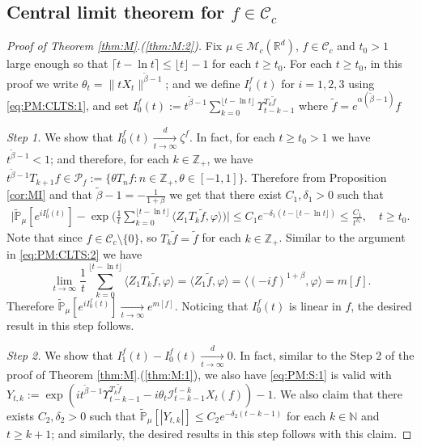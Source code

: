 \documentclass[12pt,a4paper]{amsart}
\theoremstyle{plain}
\theoremstyle{definition}
\numberwithin{equation}{section}
\begin{document}
\subsection{Central limit theorem for $f \in \mathcal C_c$}
\begin{proof}[Proof of Theorem \ref{thm:M}.(\ref{thm:M:2})]
  	Fix $\mu\in \mathcal M_c(\mathbb R^d)$, $f\in \mathcal C_c$ and $t_0 > 1$ large enough so that $ \lceil t - \ln t\rceil \leq \lfloor t \rfloor - 1$ for each $t\geq t_0$.
    For each $t\geq t_0$, in this proof we write $\theta_t = \|t X_t\|^{\tilde \beta - 1}$; and we define $I_i^f(t)$ for $i = 1,2,3$ using \eqref{eq:PM:CLTS:1}, and set
$
    I^f_0(t)
    := t^{\tilde \beta - 1}\sum_{k=0}^{\lfloor t-\ln t \rfloor} \Upsilon_{t-k-1}^{T_{k} \tilde f}
$
where $\tilde f = e^{\alpha(\tilde \beta - 1)} f$
  
  \emph{Step 1.} We show that $I^f_0(t) \xrightarrow[t\to \infty]{d} \zeta^f$. 
  In fact, for each $t \geq  t_0 > 1$ we have $t^{\tilde \beta - 1} < 1$; and therefore, for each $k \in \mathbb Z_+$, we have $t^{\tilde \beta - 1} T_{k+1} f \in \mathcal P_f:=\{\theta T_n f: n \in \mathbb Z_+, \theta \in [-1,1]\}$. 
  Therefore from Proposition \ref{cor:MI} and that $\tilde \beta - 1 = -\frac{1}{1+\beta}$ we get that there exist $C_1,\delta_1 > 0$ such that
  \begin{align}
    \Big|\mathbb{\widetilde{P}}_{\mu} [e^{i I^f_0(t)} ]-\exp\Big(\frac{1}{t}\sum_{k=0}^{\lfloor t-\ln t \rfloor} \langle Z_1T_{k}\tilde f, \varphi\rangle \Big)\Big|
    \leq C_1 e^{-\delta_1(t - \lfloor t - \ln t\rfloor)}
    \leq \frac{C_1}{t^{\delta_1}},
    \quad t\geq t_0.
  \end{align}
  Note that since $f \in \mathcal C_c\setminus \{0\}$, so $T_k \tilde f = \tilde f$ for each $k \in \mathbb Z_+$.
  Similar to the argument in \eqref{eq:PM:CLTS:2} we have 
  \[ 
    \lim_{t\to \infty} \frac{1}{t}\sum_{k=0}^{\lfloor t-\ln t \rfloor} \langle Z_1 T_{k}\tilde f, \varphi\rangle
    = \langle Z_1 \tilde f,\varphi \rangle
    = \langle (-if)^{1+\beta}, \varphi \rangle
    = m[f].
  \]
  Therefore $\mathbb {\widetilde P}_\mu[e^{i I^f_0(t)}] \xrightarrow[t\to \infty]{} e^{m[f]}$.
  Noticing that $I_0^f(t)$ is linear in $f$, the desired result in this step follows. 

  \emph{Step 2.} We show that $ I^f_1(t) - I^f_0 (t) \xrightarrow[t\to \infty]{d} 0$.
  In fact, similar to the Step 2 of the proof of Theorem \ref{thm:M}.(\ref{thm:M:1}), we also have \eqref{eq:PM:S:1} is valid with
\(
    Y_{t,k}
    := \exp(i t^{\tilde \beta - 1} \Upsilon_{t-k-1}^{T_{k}\tilde f} - i\theta_t \mathcal I_{t-k-1}^{t-k} X_t(f)) - 1.
\)
  We also claim that there exists $C_2, \delta_2>0$ such that \(\widetilde {\mathbb P}_\mu [|Y_{t,k}|] \leq C_2 e^{-\delta_2 (t-k-1)}\) for each $k\in \mathbb N$ and $t\geq k+1$; and similarly, the desired results in this step follows with this claim.


\end{proof}
\end{document}
